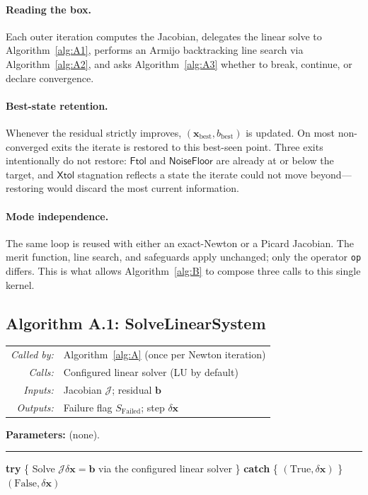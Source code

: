 \documentclass{article}
\makeatletter
\newcommand{\code}[1]{\texttt{\small #1}}
\newcommand{\moduleinterface}[4]{%
\begin{interfacecard}
\footnotesize
\begin{tabular}{@{}r@{\quad}p{0.82\textwidth}@{}}
\textit{Called by:} & #1 \\
\textit{Calls:}     & #2 \\
\textit{Inputs:}    & #3 \\
\textit{Outputs:}   & #4 \\
\end{tabular}
\end{interfacecard}
}
\makeatother
\begin{document}
\paragraph{Reading the box.}  Each outer iteration computes the Jacobian,
delegates the linear solve to Algorithm~\ref{alg:A1}, performs an
Armijo backtracking line search via Algorithm~\ref{alg:A2}, and asks
Algorithm~\ref{alg:A3} whether to break, continue, or declare
convergence.

\paragraph{Best-state retention.}  Whenever the residual strictly
improves, $(\boldsymbol{x}_{\mathrm{best}}, b_{\mathrm{best}})$ is
updated. On most non-converged exits the iterate is restored to this
best-seen point. Three exits intentionally do not restore:
$\mathsf{Ftol}$ and $\mathsf{NoiseFloor}$ are already at or below the
target, and $\mathsf{Xtol}$ stagnation reflects a state the iterate
could not move beyond---restoring would discard the most current
information.

\paragraph{Mode independence.}  The same loop is reused with either an
exact-Newton or a Picard Jacobian. The merit function, line search,
and safeguards apply unchanged; only the operator \code{op} differs.
This is what allows Algorithm~\ref{alg:B} to compose three calls to
this single kernel.

\subsection{Algorithm A.1: SolveLinearSystem}

\moduleinterface
    {Algorithm~\ref{alg:A} (once per Newton iteration)}
    {Configured linear solver (LU by default)}
    {Jacobian $\mathcal{J}$; residual $\boldsymbol{b}$}
    {Failure flag $S_{\mathrm{Failed}}$; step $\delta\boldsymbol{x}$}

\begin{algorithm}[H]
\caption{$\mathrm{SolveLinearSystem}$: factor and solve, with NaN guard.}
\label{alg:A1}
\SetAlgoLined
\textbf{Parameters:} (none).\\
\vspace{0.2cm}\hrule\vspace{0.2cm}
\textbf{try} \{ Solve $\mathcal{J} \delta\boldsymbol{x} = \boldsymbol{b}$ via the configured linear solver \} \textbf{catch} \{ \Return $(\mathrm{True}, \delta\boldsymbol{x})$  \} \\
\Return $(\mathrm{False}, \delta\boldsymbol{x})$\;
\end{algorithm}
\end{document}
